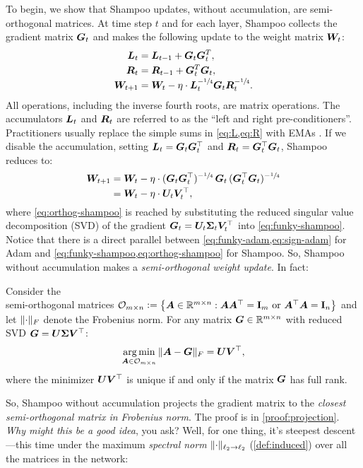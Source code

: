 To begin, we show that Shampoo updates, without accumulation, are semi-orthogonal matrices. At time step $t$ and for each layer, Shampoo collects the gradient matrix ${\bm{G}}_t$ and makes the following update to the weight matrix ${\bm{W}}_t$:
\begin{align}
    {\bm{L}}_t &= {\bm{L}}_{t-1} + {\bm{G}}_t {\bm{G}}_t^T, \label{eq:L}\\
    {\bm{R}}_t &= \smash{{\bm{R}}_{t-1} + {\bm{G}}_t^T {\bm{G}}_t}, \label{eq:R}\\
    {\bm{W}}_{t+1} &= \smash{{\bm{W}}_t - \eta \cdot {\bm{L}}_t^{-\sfrac{1}{4}} {\bm{G}}_t {\bm{R}}_t^{-\sfrac{1}{4}}}.
\end{align}
All operations, including the inverse fourth roots, are matrix operations. The accumulators ${\bm{L}}_t$ and ${\bm{R}}_t$ are referred to as the ``left and right pre-conditioners''. Practitioners usually replace the simple sums in \cref{eq:L,eq:R} with EMAs \citep{Shi2023DistributedShampoo}. If we disable the accumulation, setting ${\bm{L}}_t = {\bm{G}}_t{\bm{G}}_t^\top$ and ${\bm{R}}_t = {\bm{G}}_t^\top {\bm{G}}_t$, Shampoo reduces to:
\begin{align}
    {\bm{W}}_{t+1} &= \smash{{\bm{W}}_t - \eta \cdot ({\bm{G}}_t{\bm{G}}_t^\top)^{-\sfrac{1}{4}} \,{\bm{G}}_t\, ({\bm{G}}_t^\top{\bm{G}}_t)^{-\sfrac{1}{4}}} \label{eq:funky-shampoo}\\
    &= \smash{{\bm{W}}_t - \eta \cdot {\bm{U}}_t {\bm{V}}_t^\top}, \label{eq:orthog-shampoo}
\end{align}
where \cref{eq:orthog-shampoo} is reached by substituting the reduced singular value decomposition (SVD) of the gradient ${\bm{G}}_t = {\bm{U}}_t {\bm{\Sigma}}_t {\bm{V}}_t^\top$ into \cref{eq:funky-shampoo}. Notice that there is a direct parallel between \cref{eq:funky-adam,eq:sign-adam} for Adam and \cref{eq:funky-shampoo,eq:orthog-shampoo} for Shampoo. So, Shampoo without accumulation makes a \textit{semi-orthogonal weight update}. In fact:
\begin{myproposition}\label{prop:projection} Consider the\\semi-orthogonal matrices $\mathcal{O}_{m \times n} \vcentcolon= \left\{ {\bm{A}} \in \mathbb{R}^{m \times n} : {\bm{A}}{\bm{A}}^\top = \mathbf{I}_{m} \text{ or } {\bm{A}}^\top {\bm{A}} = \mathbf{I}_{n}\right\}$ and let $\Vert {\cdot} \Vert_F$ denote the Frobenius norm. For any matrix ${\bm{G}} \in \mathbb{R}^{m \times n}$ with reduced SVD ${\bm{G}} = {\bm{U}} {\bm{\Sigma}} {\bm{V}}^\top$:
\begin{equation}
    \operatorname*{arg\,min}_{{\bm{A}} \in \mathcal{O}_{m \times n}} \Vert {{\bm{A}}- {\bm{G}}} \Vert_F = {\bm{U}} {\bm{V}}^\top,
\end{equation}
where the minimizer ${\bm{U}}{\bm{V}}^\top$ is unique if and only if the matrix ${\bm{G}}$ has full rank.
\end{myproposition}
So, Shampoo without accumulation projects the gradient matrix to the \textit{closest semi-orthogonal matrix in Frobenius norm}. The proof is in \cref{proof:projection}. \textit{Why might this be a good idea}, you ask? Well, for one thing, it's steepest descent---this time under the maximum \textit{spectral norm} $\Vert {\cdot} \Vert_{\ell_2 \to \ell_2
}$ (\cref{def:induced}) over all the matrices in the network:

